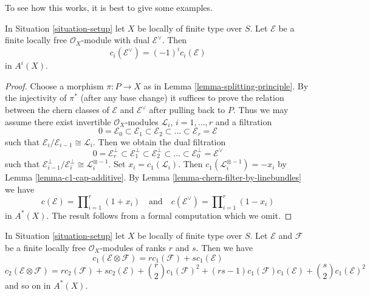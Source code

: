\medskip\noindent
To see how this works, it is best to give some examples.

\begin{lemma}
\label{lemma-chern-classes-dual}
In Situation \ref{situation-setup} let $X$ be locally of finite type over $S$.
Let $\mathcal{E}$ be a finite locally free $\mathcal{O}_X$-module
with dual $\mathcal{E}^\vee$. Then
$$
c_i(\mathcal{E}^\vee) = (-1)^i c_i(\mathcal{E})
$$
in $A^i(X)$.
\end{lemma}

\begin{proof}
Choose a morphism $\pi : P \to X$ as in
Lemma \ref{lemma-splitting-principle}.
By the injectivity of $\pi^*$ (after any base change)
it suffices to prove the relation between
the chern classes of $\mathcal{E}$ and $\mathcal{E}^\vee$
after pulling back to $P$. Thus we may assume there
exist invertible $\mathcal{O}_X$-modules
${\mathcal L}_i$, $i = 1, \ldots, r$
and a filtration
$$
0 = \mathcal{E}_0 \subset \mathcal{E}_1 \subset \mathcal{E}_2
\subset \ldots \subset \mathcal{E}_r = \mathcal{E}
$$
such that $\mathcal{E}_i/\mathcal{E}_{i - 1} \cong \mathcal{L}_i$.
Then we obtain the dual filtration
$$
0 = \mathcal{E}_r^\perp \subset \mathcal{E}_1^\perp \subset \mathcal{E}_2^\perp
\subset \ldots \subset \mathcal{E}_0^\perp = \mathcal{E}^\vee
$$
such that $\mathcal{E}_{i - 1}^\perp/\mathcal{E}_i^\perp \cong
\mathcal{L}_i^{\otimes -1}$.
Set $x_i = c_1(\mathcal{L}_i)$.
Then $c_1(\mathcal{L}_i^{\otimes -1}) = - x_i$
by Lemma \ref{lemma-c1-cap-additive}.
By Lemma \ref{lemma-chern-filter-by-linebundles}
we have
$$
c(\mathcal{E}) = \prod\nolimits_{i = 1}^r (1 + x_i)
\quad\text{and}\quad
c(\mathcal{E}^\vee) = \prod\nolimits_{i = 1}^r (1 - x_i)
$$
in $A^*(X)$. The result follows from a formal computation
which we omit.
\end{proof}

\begin{lemma}
\label{lemma-chern-classes-tensor-product}
In Situation \ref{situation-setup} let $X$ be locally of finite type over $S$.
Let $\mathcal{E}$ and $\mathcal{F}$ be a finite locally free
$\mathcal{O}_X$-modules of ranks $r$ and $s$. Then we have
$$
c_1(\mathcal{E} \otimes \mathcal{F})
=
r c_1(\mathcal{F}) + s c_1(\mathcal{E})
$$
$$
c_2(\mathcal{E} \otimes \mathcal{F})
=
r c_2(\mathcal{F}) + s c_2(\mathcal{E}) +
{r \choose 2} c_1(\mathcal{F})^2 +
(rs - 1) c_1(\mathcal{F})c_1(\mathcal{E}) +
{s \choose 2} c_1(\mathcal{E})^2
$$
and so on in $A^*(X)$.
\end{lemma}

